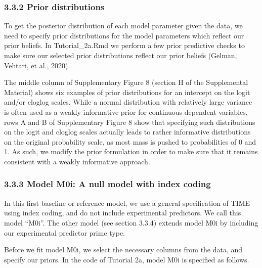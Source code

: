 \documentclass[
  english,
  man, donotrepeattitle,floatsintext]{apa6}
\begin{document}
\normalsize

\subsubsection{3.3.2 Prior distributions}\label{prior-distributions}

To get the posterior distribution of each model parameter given the data, we need to specify prior distributions for the model parameters which reflect our prior beliefs.
In Tutorial\_2a.Rmd we perform a few prior predictive checks to make sure our selected prior distributions reflect our prior beliefs (Gelman, Vehtari, et al., 2020).

The middle column of Supplementary Figure 8 (section H of the Supplemental Material) shows six examples of prior distributions for an intercept on the logit and/or cloglog scales. While a normal distribution with relatively large variance is often used as a weakly informative prior for continuous dependent variables, rows A and B of Supplementary Figure 8 show that specifying such distributions on the logit and cloglog scales actually leads to rather informative distributions on the original probability scale, as most mass is pushed to probabilities of 0 and 1. As such, we modify the prior formulation in order to make sure that it remains consistent with a weakly informative approach.

\subsubsection{3.3.3 Model M0i: A null model with index coding}\label{model-m0i-a-null-model-with-index-coding}

In this first baseline or reference model, we use a general specification of TIME using index coding, and do not include experimental predictors. We call this model ``M0i''. The other model (see section 3.3.4) extends model M0i by including our experimental predictor prime type.

Before we fit model M0i, we select the necessary columns from the data, and specify our priors. In the code of Tutorial 2a, model M0i is specified as follows.
\end{document}
